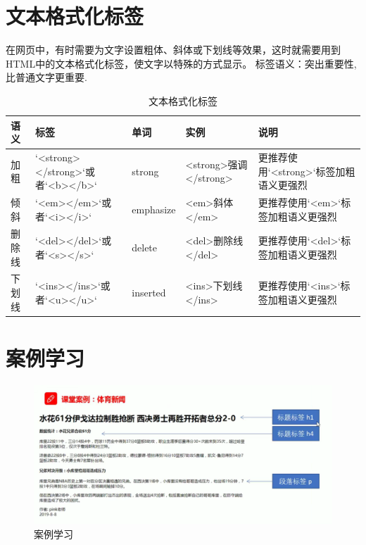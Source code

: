 \documentclass[
]{book}
\begin{document}
\hypertarget{ux6587ux672cux683cux5f0fux5316ux6807ux7b7e}{%
\section{文本格式化标签}\label{ux6587ux672cux683cux5f0fux5316ux6807ux7b7e}}

在网页中，有时需要为文字设置粗体、斜体或下划线等效果，这时就需要用到HTML中的文本格式化标签，使文字以特殊的方式显示。
标签语义：突出重要性,比普通文字更重要.

\begin{table}

\caption{\label{tab:unnamed-chunk-2}文本格式化标签}
\centering
\begin{tabular}[t]{lllll}
\toprule
语义 & 标签 & 单词 & 实例 & 说明\\
\midrule
加粗 & `<strong></strong>`或者`<b></b>` & strong & <strong>强调</strong> & 更推荐使用`<strong>`标签加粗语义更强烈\\
倾斜 & `<em></em>`或者`<i></i>` & emphasize & <em>斜体</em> & 更推荐使用`<em>`标签加粗语义更强烈\\
删除线 & `<del></del>`或者`<s></s>` & delete & <del>删除线</del> & 更推荐使用`<del>`标签加粗语义更强烈\\
下划线 & `<ins></ins>`或者`<u></u>` & inserted & <ins>下划线</ins> & 更推荐使用`<ins>`标签加粗语义更强烈\\
\bottomrule
\end{tabular}
\end{table}

\hypertarget{ux6848ux4f8bux5b66ux4e60}{%
\section{案例学习}\label{ux6848ux4f8bux5b66ux4e60}}

\begin{figure}

{\centering \includegraphics{fig/1-7} 

}

\caption{案例学习}\label{fig:unnamed-chunk-3}
\end{figure}
\end{document}
